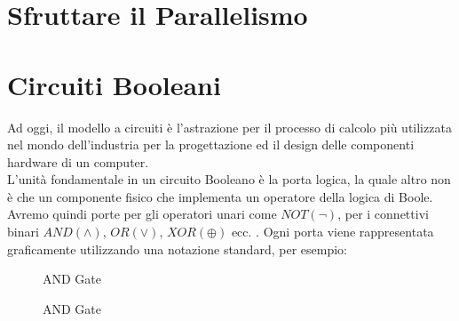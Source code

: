 \documentclass[12pt,a4paper,openright]{report}
\newcommand*\xor{\mathbin{\oplus}}
\begin{document}
\section{Sfruttare il Parallelismo}



\section{Circuiti Booleani}
Ad oggi, il modello a circuiti è l'astrazione per il processo di calcolo più utilizzata nel mondo dell'industria per la progettazione ed il
design delle componenti hardware di un computer.\\
L'unità fondamentale in un circuito Booleano è la porta logica, la quale altro non è che un componente fisico che implementa un operatore della logica di Boole. 
Avremo quindi porte per gli operatori unari come $NOT(\neg)$, per i connettivi binari $AND(\land)$, $OR(\lor)$, $XOR(\xor)$ ecc. . Ogni porta viene rappresentata graficamente 
utilizzando una notazione standard, per esempio: 
\vspace{10pt}
\begin{figure}[h]
    \centering
        \resizebox{.3\textwidth}{!} {%
                    
        }
        \caption{AND Gate}
    
\end{figure}
\begin{figure}[h] 
    \centering
        \caption{AND Gate}
\end{figure}
\end{document}
